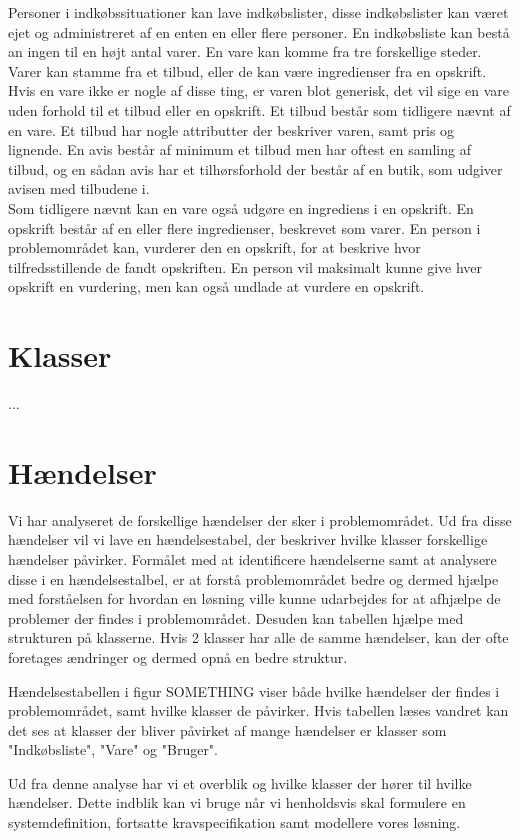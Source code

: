 Personer i indkøbssituationer kan lave indkøbslister, disse indkøbslister kan været ejet og administreret af en enten en eller flere personer. 
En indkøbsliste kan bestå an ingen til en højt antal varer.
En vare kan komme fra tre forskellige steder.
Varer kan stamme fra et tilbud, eller de kan være ingredienser fra en opskrift. 
Hvis en vare ikke er nogle af disse ting, er varen blot generisk, det vil sige en vare uden forhold til et tilbud eller en opskrift.
Et tilbud består som tidligere nævnt af en vare.
Et tilbud har nogle attributter der beskriver varen, samt pris og lignende.
En avis består af minimum et tilbud men har oftest en samling af tilbud, og en sådan avis har et tilhørsforhold der består af en butik, som udgiver avisen med tilbudene i.\\
Som tidligere nævnt kan en vare også udgøre en ingrediens i en opskrift.
En opskrift består af en eller flere ingredienser, beskrevet som varer.
En person i problemområdet kan, vurderer den en opskrift, for at beskrive hvor tilfredsstillende de fandt opskriften.
En person vil maksimalt kunne give hver opskrift en vurdering, men kan også undlade at vurdere en opskrift.

\section{Klasser}
...

\section{Hændelser}
Vi har analyseret de forskellige hændelser der sker i problemområdet.   
Ud fra disse hændelser vil vi lave en hændelsestabel, der beskriver hvilke klasser forskellige hændelser påvirker.
Formålet med at identificere hændelserne samt at analysere disse i en hændelsestalbel, er at forstå problemområdet bedre og dermed hjælpe med forståelsen for hvordan en løsning ville kunne udarbejdes for at afhjælpe de problemer der findes i problemområdet. Desuden kan tabellen hjælpe med strukturen på klasserne. 
Hvis 2 klasser har alle de samme hændelser, kan der ofte foretages ændringer og dermed opnå en bedre struktur.



Hændelsestabellen i figur SOMETHING viser både hvilke hændelser der findes i problemområdet, samt hvilke klasser de påvirker.
Hvis tabellen læses vandret kan det ses at klasser der bliver påvirket af mange hændelser er klasser som "Indkøbsliste", "Vare" og "Bruger".


Ud fra denne analyse har vi et overblik og hvilke klasser der hører til hvilke hændelser.
Dette indblik kan vi bruge når vi henholdsvis skal formulere en systemdefinition, fortsatte kravspecifikation samt modellere vores løsning. 